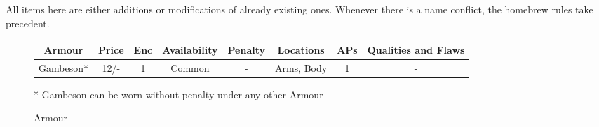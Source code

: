 \documentclass[parskip=full,11pt]{wfrp-short}
\begin{document}
All items here are either additions or modifications of already existing ones.
Whenever there is a name conflict, the homebrew rules take precedent.

\begin{figure*}[b]
    \begin{tcolorbox}[standard jigsaw, colback=yellow!5!orange, opacityback=.25, boxrule=0pt]
    \caption{Armour}
    \centering
    \begin{tabu}{c|c|c|c|c|c|c|c}
        \rowfont{\bfseries} Armour & Price & Enc & Availability &
            Penalty & Locations & APs & Qualities and Flaws\\
        \hline
        Gambeson* & 12/- & 1 & Common & - & Arms, Body & 1 & -\\
    \end{tabu}
		\newline \newline
		* Gambeson can be worn without penalty under any other Armour
    \end{tcolorbox}
\end{figure*}
\end{document}
